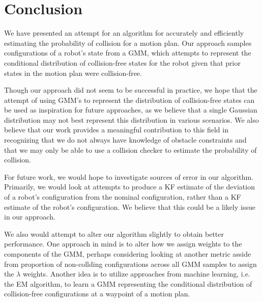 \documentclass[journal]{IEEEtran}
\begin{document}
\section{Conclusion}
We have presented an attempt for an algorithm for accurately and efficiently estimating the probability of collision for a motion plan. Our approach samples configurations of a robot's state from a GMM, which attempts to represent the conditional distribution of collision-free states for the robot given that prior states in the motion plan were collision-free.

Though our approach did not seem to be successful in practice, we hope that the attempt of using GMM's to represent the distribution of collision-free states can be used as inspiration for future approaches, as we believe that a single Gaussian distribution may not best represent this distribution in various scenarios. We also believe that our work provides a meaningful contribution to this field in recognizing that we do not always have knowledge of obstacle constraints and that we may only be able to use a collision checker to estimate the probability of collision.

For future work, we would hope to investigate sources of error in our algorithm. Primarily, we would look at attempts to produce a KF estimate of the deviation of a robot's configuration from the nominal configuration, rather than a KF estimate of the robot's configuration. We believe that this could be a likely issue in our approach.

We also would attempt to alter our algorithm slightly to obtain better performance. One approach in mind is to alter how we assign weights to the components of the GMM, perhaps considering looking at another metric asside from proportion of non-collding configurations across all GMM samples to assign the $\lambda$ weights. Another idea is to utilize approaches from machine learning, i.e. the EM algorithm, to learn a GMM representing the conditional distribution of collision-free configurations at a waypoint of a motion plan.

%
%
\end{document}
